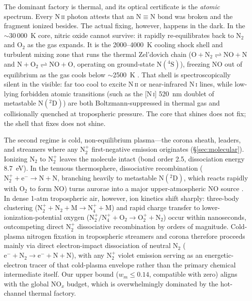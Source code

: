 \documentclass[11pt,a4paper]{article}
\newcommand{\Ntp}{N$_2^+$}
\begin{document}
The dominant factory is thermal, and its optical certificate is the
\emph{atomic} spectrum. Every N\,\textsc{ii} photon attests that an
N$\equiv$N bond was broken and the fragment ionized besides. The actual
fixing, however, happens in the dark. In the $\sim$30\,000~K core, nitric oxide
cannot survive: it rapidly re-equilibrates back to N$_2$ and O$_2$ as the gas
expands. It is the 2000--4000~K cooling shock shell and turbulent mixing zone
that runs the thermal Zel'dovich chain
($\mathrm{O + N_2 \rightleftharpoons NO + N}$ and
$\mathrm{N + O_2 \rightleftharpoons NO + O}$, operating on ground-state
$\mathrm{N(^4S)}$), freezing NO out of equilibrium as the gas cools below
$\sim$2500~K \citep{zeldovich1966,borucki1984}. That shell is
spectroscopically silent in the visible: far too cool to excite N\,\textsc{ii}
or near-infrared N\,\textsc{i} lines, while low-lying forbidden atomic
transitions (such as the [N\,\textsc{i}] 520~nm doublet of metastable
$\mathrm{N(^2D)}$) are both Boltzmann-suppressed in thermal gas and
collisionally quenched at tropospheric pressure. The core that shines does not
fix; the shell that fixes does not shine.

The second regime is cold, non-equilibrium plasma---the corona sheath,
leaders, and streamers where any \Ntp{} first-negative emission originates
(\S\ref{sec:molecular}). Ionizing N$_2$ to \Ntp{} leaves the molecule intact
(bond order 2.5, dissociation energy 8.7~eV). In the tenuous thermosphere,
dissociative recombination ($\mathrm{N_2^+ + e^- \to N + N}$, branching
heavily to metastable $\mathrm{N(^2D)}$, which reacts rapidly with O$_2$ to
form NO) turns aurorae into a major upper-atmospheric NO source
\citep{rees1989,barth1992}. In dense 1-atm tropospheric air, however, ion
kinetics shift sharply: three-body clustering
($\mathrm{N_2^+ + N_2 + M \to N_4^+ + M}$) and rapid charge transfer to
lower-ionization-potential oxygen
($\mathrm{N_2^+/N_4^+ + O_2 \to O_2^+ + N_2}$) occur within nanoseconds,
outcompeting direct \Ntp{} dissociative recombination by orders of magnitude.
Cold-plasma nitrogen fixation in tropospheric streamers and corona therefore
proceeds mainly via direct electron-impact dissociation of neutral N$_2$
($\mathrm{e^- + N_2 \to e^- + N + N}$), with any \Ntp{} violet emission
serving as an energetic-electron tracer of that cold-plasma envelope rather
than the primary chemical intermediate itself. Our upper bound
($w_m \le 0.14$, compatible with zero) aligns with the global NO$_x$ budget,
which is overwhelmingly dominated by the hot-channel thermal factory.
\end{document}
